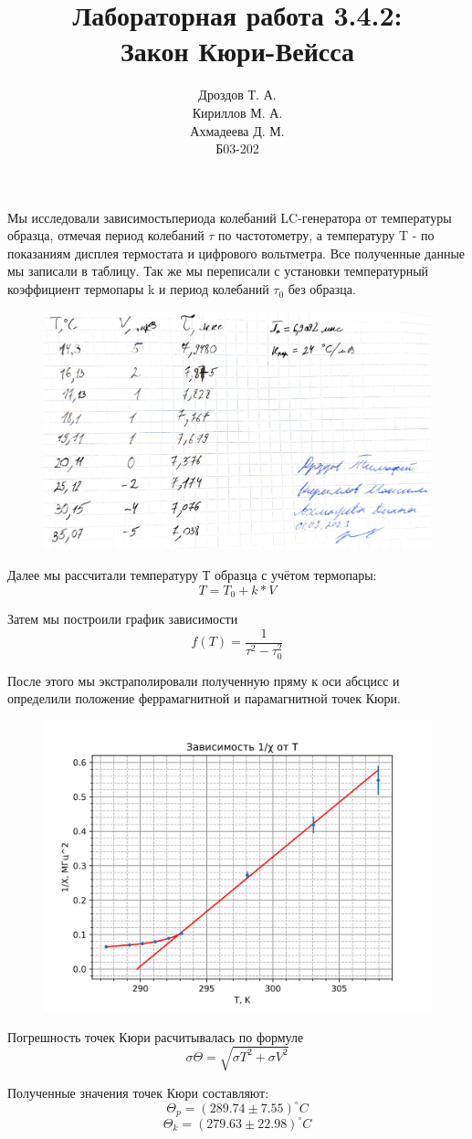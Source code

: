 \documentclass[a4paper,12pt]{article}
\title{Лабораторная работа 3.4.2: \\Закон Кюри-Вейсса}
\author{Дроздов Т. А.\\ Кириллов М. А.\\ Ахмадеева Д. М. \\Б03-202}
\date{}
\begin{document}
 

\maketitle

Мы исследовали зависимостьпериода колебаний LC-генератора от температуры образца, отмечая период колебаний $\tau$ по частотометру, а температуру T - по показаниям дисплея термостата и цифрового вольтметра. Все полученные данные мы записали в таблицу. Так же мы переписали с установки температурный коэффициент термопары k и период колебаний $\tau_0$ без образца.



\begin{figure}[h]
	\centering 
	\includegraphics[width=0.8\linewidth]{data.jpg}
\end{figure}

\FloatBarrier

Далее мы рассчитали температуру Т образца с учётом термопары: \[T = T_0 + k * V\]


Затем мы построили график зависимости \[f(T) = \frac{1}{\tau^2 - \tau_0^2}\]

После этого мы экстраполировали полученную пряму к оси абсцисс и определили положение феррамагнитной и парамагнитной точек Кюри.

\FloatBarrier

\begin{figure}[h]
	\centering 
	\includegraphics[width=0.8\linewidth]{graph.png}
\end{figure}

\FloatBarrier

Погрешность точек Кюри расчитывалась по формуле \[\sigma \Theta = \sqrt{\sigma T^2 + \sigma V^2}\]

Полученные значения точек Кюри составляют: \[\Theta_p = (289.74 \pm 7.55) ^\circ C\] \[\Theta_k = (279.63 \pm 22.98) ^\circ C\]
\end{document}
